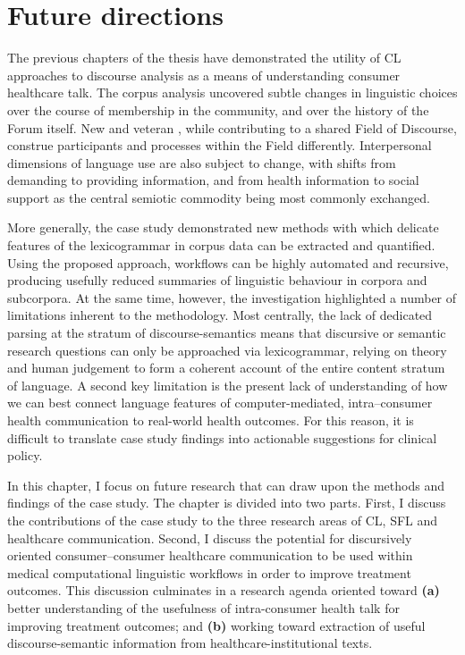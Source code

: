
\chapter{Future directions} \label{chap:futuredirections}

The previous chapters of the thesis have demonstrated the utility of \gls{CL} approaches to discourse analysis as a means of understanding consumer healthcare talk. The \gls{corpus} analysis uncovered subtle changes in linguistic choices over the course of membership in the community, and over the history of the \gls{Forum} itself. New and veteran , while contributing to a shared Field of Discourse, construe participants and processes within the Field differently. Interpersonal dimensions of language use are also subject to change, with shifts from demanding to providing information, and from health information to social support as the central semiotic commodity being most commonly exchanged.

More generally, the case study demonstrated new methods with which delicate features of the lexicogrammar in corpus data can be extracted and quantified. Using the proposed approach, workflows can be highly automated and recursive, producing usefully reduced summaries of linguistic behaviour in corpora and subcorpora. %
At the same time, however, the investigation highlighted a number of limitations inherent to the methodology. Most centrally, the lack of dedicated parsing at the stratum of discourse-semantics means that discursive or semantic research questions can only be approached via lexicogrammar, relying on theory and human judgement to form a coherent account of the entire content stratum of language. A second key limitation is the present lack of understanding of how we can best connect language features of computer\hyp{}mediated, intra--consumer health communication to real\hyp{}world health outcomes. For this reason, it is difficult to translate case study findings into actionable suggestions for clinical policy.

In this chapter, I focus on future research that can draw upon the methods and findings of the case study. The chapter is divided into two parts. First, I discuss the contributions of the case study to the three research areas of \gls{CL}, \gls{SFL} and healthcare communication. Second, I discuss the potential for discursively oriented consumer--consumer healthcare communication to be used within medical computational linguistic workflows in order to improve treatment outcomes. This discussion culminates in a research agenda oriented toward \textbf{(a)} better understanding of the usefulness of intra-consumer health talk for improving treatment outcomes; and \textbf{(b)} working toward extraction of useful discourse-semantic information from healthcare-institutional texts.


